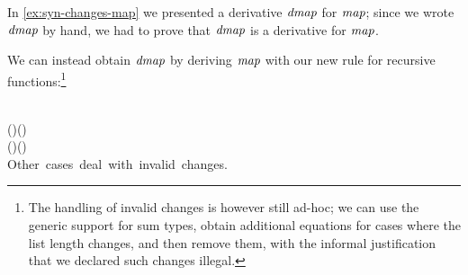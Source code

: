 \begin{example}
  In \cref{ex:syn-changes-map} we presented a derivative \ensuremath{\Varid{dmap}} for
  \ensuremath{\Varid{map}}; since we wrote \ensuremath{\Varid{dmap}} by hand, we had to prove that \ensuremath{\Varid{dmap}} is a
  derivative for \ensuremath{\Varid{map}}.

  We can instead obtain \ensuremath{\Varid{dmap}} by deriving \ensuremath{\Varid{map}} with our new rule for recursive
  functions:\footnote{The handling of invalid changes is however still ad-hoc;
    we can use the generic support for sum types, obtain additional equations
    for cases where the list length changes, and then remove them, with the
    informal justification that we declared such changes illegal.}

\begin{hscode}\SaveRestoreHook
{}%
%
%
\>[B]{}\;\;\;\;\mathrel{=}\<[E]%
\\
\>[B]{}\;\;\;(\;\;)\;(\;\;)\mathrel{=}{}\<[E]%
\\
\>[B]{}\<[3]%
\>[3]{}\;(\;\;)\;(\;\;\;\;){}\<[E]%
\\
\>[B]{}\mbox{\onelinecomment  Other cases deal with invalid changes.}{}\<[E]%
\\
\>[B]{}\;\;\;\;\mathrel{=}\<[E]%
\ColumnHook
\end{hscode}\resethooks
\end{example}

